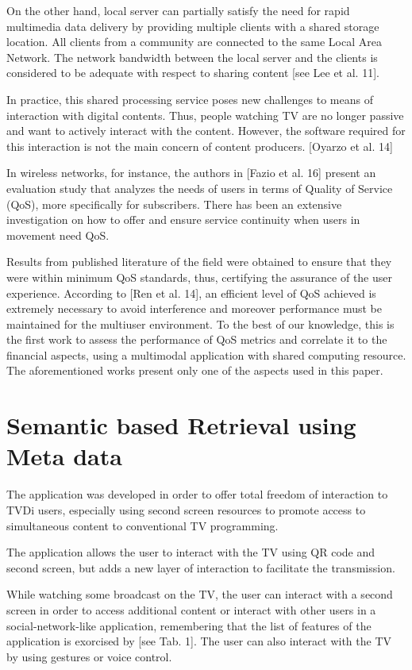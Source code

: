 \documentclass{cai}
\begin{document}
On the other hand, local server can partially satisfy the need for rapid multimedia data delivery by providing multiple clients with a shared storage location. All clients from a community are connected to the same Local Area Network. The network bandwidth between the local server and the clients is considered to be adequate with respect to sharing content [see Lee et al. 11].

In practice, this shared processing service poses new challenges to means of interaction with digital contents. Thus, people watching TV are no longer passive and want to actively interact with the content. However, the software required for this interaction is not the main concern of content producers. [Oyarzo et al. 14]

In wireless networks, for instance, the authors in [Fazio et al. 16] present an evaluation study that analyzes the needs of users in terms of Quality of Service (QoS), more specifically for subscribers. There has been an extensive investigation on how to offer and ensure service continuity when users in movement need QoS.

Results from published literature of the field were obtained to ensure that they were within minimum QoS standards, thus, certifying the assurance of the user experience. According to [Ren et al. 14], an efficient level of QoS achieved is extremely necessary to avoid interference and moreover performance must be maintained for the multiuser environment. To the best of our knowledge, this is the first work to assess the performance of QoS metrics and correlate it to the financial aspects, using a multimodal application with shared computing resource. The aforementioned works present only one of the aspects used in this paper.

\section{Semantic based Retrieval using Meta data}
The application was developed in order to offer total freedom of interaction to TVDi users, especially using second screen resources to promote access to simultaneous content to conventional TV programming. 

 The application allows the user to interact with the TV using QR code and second screen, but adds a new layer of interaction to facilitate the transmission.
 
While watching some broadcast on the TV, the user can interact with a second screen in order to access additional content or interact with other users in a social-network-like application, remembering that the list of features of the application is exorcised by [see Tab. 1]. The user can also interact with the TV by using gestures or voice control. 
\end{document}
